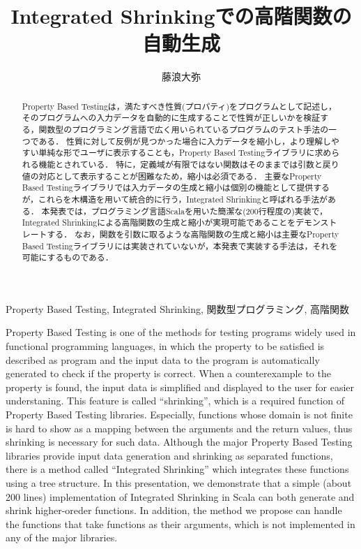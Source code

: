\documentclass[submit,PRO]{ipsj}
\title{Integrated Shrinkingでの高階関数の自動生成}
\author{藤浪大弥}{FUJINAMI Hiroya}{NihonUCHS}[fnamty.js@gmail.com]
\theoremstyle{definition}
\begin{document}
\begin{abstract}
  Property Based Testingは，満たすべき性質(プロパティ)をプログラムとして記述し，そのプログラムへの入力データを自動的に生成することで性質が正しいかを検証する，関数型のプログラミング言語で広く用いられているプログラムのテスト手法の一つである．
  性質に対して反例が見つかった場合に入力データを縮小し，より理解しやすい単純な形でユーザに表示することも，Property Based Testingライブラリに求められる機能とされている．
  特に，定義域が有限ではない関数はそのままでは引数と戻り値の対応として表示することが困難なため，縮小は必須である．
  主要なProperty Based Testingライブラリでは入力データの生成と縮小は個別の機能として提供するが，これらを木構造を用いて統合的に行う，Integrated Shrinkingと呼ばれる手法がある．
  本発表では，プログラミング言語Scalaを用いた簡潔な(200行程度の)実装で，Integrated Shrinkingによる高階関数の生成と縮小が実現可能であることをデモンストレートする．
  なお，関数を引数に取るような高階関数の生成と縮小は主要なProperty Based Testingライブラリには実装されていないが，本発表で実装する手法は，それを可能にするものである．
\end{abstract}

\begin{jkeyword}
  Property Based Testing, Integrated Shrinking, 関数型プログラミング, 高階関数
\end{jkeyword}


\begin{eabstract}
  Property Based Testing is one of the methods for testing programs widely used in functional programming languages, in which the property to be satisfied is described as program and the input data to the program is automatically generated to check if the property is correct.
  When a counterexample to the property is found, the input data is simplified and displayed to the user for easier understaning. This feature is called ``shrinking'', which is a required function of Property Based Testing libraries.
  Especially, functions whose domain is not finite is hard to show as a mapping between the arguments and the return values, thus shrinking is necessary for such data.
  Although the major Property Based Testing libraries provide input data generation and shrinking as separated functions, there is a method called ``Integrated Shrinking'' which integrates these functions using a tree structure.
  In this presentation, we demonstrate that a simple (about 200 lines) implementation of Integrated Shrinking in Scala can both generate and shrink higher-oreder functions.
  In addition, the method we propose can handle the functions that take functions as their arguments, which is not implemented in any of the major libraries.
\end{eabstract}
\end{document}
